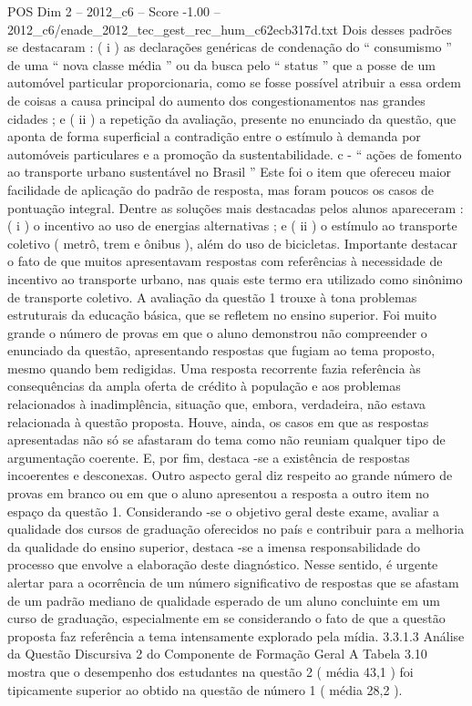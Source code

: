 \begin{textsample}{POS Dim 2 – 2012\_c6 – Score -1.00 – 2012\_c6/enade\_2012\_tec\_gest\_rec\_hum\_c62ecb317d.txt}
Dois desses padrões se destacaram : ( i ) as declarações genéricas de condenação do “ consumismo ” de uma “ nova classe média ” ou da busca pelo “ status ” que a posse de um automóvel particular proporcionaria, como se fosse possível atribuir a essa ordem de coisas a causa principal do aumento dos congestionamentos nas grandes cidades ; e ( ii ) a repetição da avaliação, presente no enunciado da questão, que aponta de forma superficial a contradição entre o estímulo à demanda por automóveis particulares e a promoção da sustentabilidade. c - “ ações de fomento ao transporte urbano sustentável no Brasil ” Este foi o item que ofereceu maior facilidade de aplicação do padrão de resposta, mas foram poucos os casos de pontuação integral.
Dentre as soluções mais destacadas pelos alunos apareceram : ( i ) o incentivo ao uso de energias alternativas ; e ( ii ) o estímulo ao transporte coletivo ( metrô, trem e ônibus ), além do uso de bicicletas.
Importante destacar o fato de que muitos apresentavam respostas com referências à necessidade de incentivo ao transporte urbano, nas quais este termo era utilizado como sinônimo de transporte coletivo.
A avaliação da questão 1 trouxe à tona problemas estruturais da educação básica, que se refletem no ensino superior.
Foi muito grande o número de provas em que o aluno demonstrou não compreender o enunciado da questão, apresentando respostas que fugiam ao tema proposto, mesmo quando bem redigidas.
Uma resposta recorrente fazia referência às consequências da ampla oferta de crédito à população e aos problemas relacionados à inadimplência, situação que, embora, verdadeira, não estava relacionada à questão proposta.
Houve, ainda, os casos em que as respostas apresentadas não só se afastaram do tema como não reuniam qualquer tipo de argumentação coerente.
E, por fim, destaca -se a existência de respostas incoerentes e desconexas.
Outro aspecto geral diz respeito ao grande número de provas em branco ou em que o aluno apresentou a resposta a outro item no espaço da questão 1.
Considerando -se o objetivo geral deste exame, avaliar a qualidade dos cursos de graduação oferecidos no país e contribuir para a melhoria da qualidade do ensino superior, destaca -se a imensa responsabilidade do processo que envolve a elaboração deste diagnóstico.
Nesse sentido, é urgente alertar para a ocorrência de um número significativo de respostas que se afastam de um padrão mediano de qualidade esperado de um aluno concluinte em um curso de graduação, especialmente em se considerando o fato de que a questão proposta faz referência a tema intensamente explorado pela mídia. 3.3.1.3 Análise da Questão Discursiva 2 do Componente de Formação Geral A Tabela 3.10 mostra que o desempenho dos estudantes na questão 2 ( média 43,1 ) foi tipicamente superior ao obtido na questão de número 1 ( média 28,2 ).

\end{textsample}
